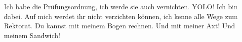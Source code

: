 \begin{verseplay}[10em]
\s{\Frodo} Ich habe die Prüfungsordnung, ich werde sie auch vernichten. 
\s{\Sum} YOLO! Ich bin dabei.
\s{\Gandalf} Auf mich werdet ihr nicht verzichten können, ich kenne alle Wege zum Rektorat.
\s{\Legolars} Du kannst mit meinem Bogen rechnen. 
\s{\Gimli} Und mit meiner Axt! Und meinem Sandwich! 


\end{verseplay}
